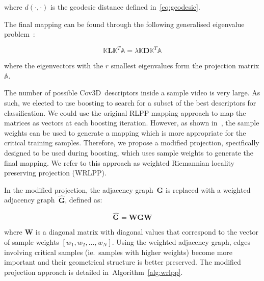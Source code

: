 \documentclass[10pt,twocolumn,letterpaper]{article}
\newcommand{\alg}[1]{\mbox{Algorithm~\ref{#1}}}
\newcommand{\eqsize}{\footnotesize}
\newcommand{\cov}{{Cov3D}}
\newcommand{\wrlpp}{WRLPP}
\newcommand{\mat}[1]{{\boldsymbol{#1}}}
\begin{document}
\noindent
where {\eqsize $d(\cdot, \cdot)$} is the geodesic distance defined in~\eqref{eq:geodesic}.

The final mapping can be found through the following generalised eigenvalue problem~\cite{HarandiEtAl2012}:

\vspace{-1ex}
\eqsize
\begin{equation}
    \mathbb{K} \mat{L} \mathbb{K}^T \mathbb{A} = \lambda \mathbb{K} \mat{D} \mathbb{K}^T \mathbb{A}
\end{equation}
\normalsize

\noindent
where the eigenvectors with the {\eqsize $r$} smallest eigenvalues form the projection matrix {\eqsize $\mathbb{A}$}.

The number of possible \cov~descriptors inside a sample video is very large.
As such, we elected to use boosting to search for a subset of the best descriptors for classification.
We could use the original RLPP mapping approach to map the matrices as vectors at each boosting iteration.
However, as shown in~\cite{TuzelEtAl2008}, the sample weights can be used to generate a mapping
which is more appropriate for the critical training samples.
Therefore, we propose a modified projection, specifically designed to be used during boosting,
which uses sample weights to generate the final mapping.
We refer to this approach as weighted Riemannian locality preserving projection (\wrlpp).

In the modified projection,
the adjacency graph~{\eqsize $\mat{G}$} is replaced 
with a weighted adjacency graph~{\eqsize $\widehat{\mat{G}}$},
defined as:

\vspace{-1ex}
\eqsize
\begin{equation}
  \widehat{\mat{G}} = \mat{W} \mat{G} \mat{W}
\end{equation}
\normalsize

\noindent
where {\eqsize $\mat{W}$} is a diagonal matrix with diagonal values
that correspond to the vector of sample weights {\eqsize $[ w_1, w_2, \ldots, w_N ]$}.
Using the weighted adjacency graph, edges involving critical samples
(ie.~samples with higher weights) become more important and their geometrical structure is better preserved.
The modified projection approach is detailed in~\alg{alg:wrlpp}.
\end{document}
